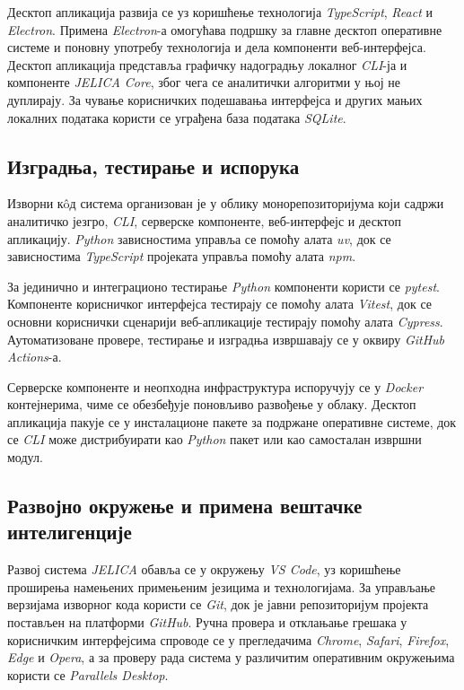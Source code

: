 \documentclass[12pt,oneside]{memoir}
\begin{document}
Десктоп апликација развија се уз коришћење технологија \textit{TypeScript}, \textit{React} и \textit{Electron}. Примена \textit{Electron}-а омогућава подршку за главне десктоп оперативне системе и поновну употребу технологија и дела компоненти веб-интерфејса. Десктоп апликација представља графичку надоградњу локалног \textit{CLI}-ја и компоненте \textit{JELICA Core}, због чега се аналитички алгоритми у њој не дуплирају. За чување корисничких подешавања интерфејса и других мањих локалних података користи се уграђена база података \textit{SQLite}.


\subsection{Изградња, тестирање и испорука}
Изворни кôд система организован је у облику монорепозиторијума који садржи аналитичко језгро, \textit{CLI}, серверске компоненте, веб-интерфејс и десктоп апликацију. \textit{Python} зависностима управља се помоћу алата \textit{uv}, док се зависностима \textit{TypeScript} пројеката управља помоћу алата \textit{npm}.

За јединично и интеграционо тестирање \textit{Python} компоненти користи се \textit{pytest}. Компоненте корисничког интерфејса тестирају се помоћу алата \textit{Vitest}, док се основни кориснички сценарији веб-апликације тестирају помоћу алата \textit{Cypress}. Аутоматизоване провере, тестирање и изградња извршавају се у оквиру \textit{GitHub Actions}-а.

Серверске компоненте и неопходна инфраструктура испоручују се у \textit{Docker} контејнерима, чиме се обезбеђује поновљиво развођење у облаку. Десктоп апликација пакује се у инсталационе пакете за подржане оперативне системе, док се \textit{CLI} може дистрибуирати као \textit{Python} пакет или као самосталан извршни модул.


\subsection{Развојно окружење и примена вештачке интелигенције}
Развој система \textit{JELICA} обавља се у окружењу \textit{VS Code}, уз коришћење проширења намењених примењеним језицима и технологијама. За управљање верзијама изворног кода користи се \textit{Git}, док је јавни репозиторијум пројекта постављен на платформи \textit{GitHub}. Ручна провера и отклањање грешака у корисничким интерфејсима спроводе се у прегледачима \textit{Chrome}, \textit{Safari}, \textit{Firefox}, \textit{Edge} и \textit{Opera}, а за проверу рада система у различитим оперативним окружењима користи се \textit{Parallels Desktop}.
\end{document}
